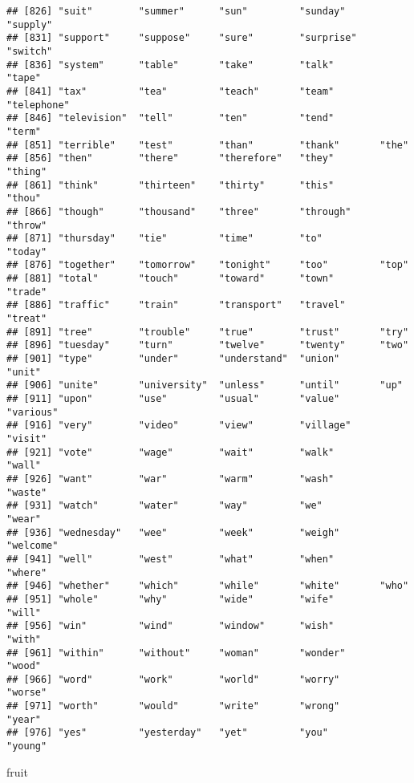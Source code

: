 \documentclass[
]{article}
\newenvironment{Shaded}{\begin{snugshade}}{\end{snugshade}}
\newcommand{\NormalTok}[1]{#1}
\begin{document}
\begin{verbatim}
## [826] "suit"        "summer"      "sun"         "sunday"      "supply"     
## [831] "support"     "suppose"     "sure"        "surprise"    "switch"     
## [836] "system"      "table"       "take"        "talk"        "tape"       
## [841] "tax"         "tea"         "teach"       "team"        "telephone"  
## [846] "television"  "tell"        "ten"         "tend"        "term"       
## [851] "terrible"    "test"        "than"        "thank"       "the"        
## [856] "then"        "there"       "therefore"   "they"        "thing"      
## [861] "think"       "thirteen"    "thirty"      "this"        "thou"       
## [866] "though"      "thousand"    "three"       "through"     "throw"      
## [871] "thursday"    "tie"         "time"        "to"          "today"      
## [876] "together"    "tomorrow"    "tonight"     "too"         "top"        
## [881] "total"       "touch"       "toward"      "town"        "trade"      
## [886] "traffic"     "train"       "transport"   "travel"      "treat"      
## [891] "tree"        "trouble"     "true"        "trust"       "try"        
## [896] "tuesday"     "turn"        "twelve"      "twenty"      "two"        
## [901] "type"        "under"       "understand"  "union"       "unit"       
## [906] "unite"       "university"  "unless"      "until"       "up"         
## [911] "upon"        "use"         "usual"       "value"       "various"    
## [916] "very"        "video"       "view"        "village"     "visit"      
## [921] "vote"        "wage"        "wait"        "walk"        "wall"       
## [926] "want"        "war"         "warm"        "wash"        "waste"      
## [931] "watch"       "water"       "way"         "we"          "wear"       
## [936] "wednesday"   "wee"         "week"        "weigh"       "welcome"    
## [941] "well"        "west"        "what"        "when"        "where"      
## [946] "whether"     "which"       "while"       "white"       "who"        
## [951] "whole"       "why"         "wide"        "wife"        "will"       
## [956] "win"         "wind"        "window"      "wish"        "with"       
## [961] "within"      "without"     "woman"       "wonder"      "wood"       
## [966] "word"        "work"        "world"       "worry"       "worse"      
## [971] "worth"       "would"       "write"       "wrong"       "year"       
## [976] "yes"         "yesterday"   "yet"         "you"         "young"
\end{verbatim}

\begin{Shaded}
\begin{Highlighting}[]
\NormalTok{fruit}
\end{Highlighting}
\end{Shaded}
\end{document}
